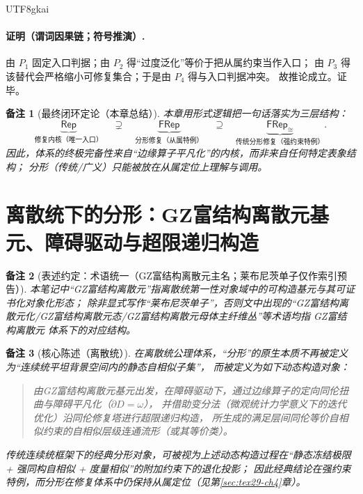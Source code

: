 \documentclass[12pt]{article}
\newtheorem{remark}{备注}[section]
\newcommand{\KouJing}{\texorpdfstring{表述约定}{表述约定}}
\newcommand{\GZMonFull}{\texorpdfstring{GZ富结构离散元}{GZ富结构离散元}}
\newcommand{\GZMon}{\texorpdfstring{GZ富结构离散元}{GZ富结构离散元}}
\newcommand{\GZMonization}{\texorpdfstring{GZ富结构离散元化}{GZ富结构离散元化}}
\newcommand{\GZMonState}{\texorpdfstring{GZ富结构离散元态}{GZ富结构离散元态}}
\newcommand{\GZMonMotherBundle}{\texorpdfstring{GZ富结构离散元母体主纤维丛}{GZ富结构离散元母体主纤维丛}}
\begin{document}
\begin{CJK*}{UTF8}{gkai}
\paragraph{证明（谓词因果链；符号推演）.}
由 $P_1$ 固定入口判据；由 $P_2$ 得“过度泛化”等价于把从属约束当作入口；
由 $P_3$ 得该替代会严格缩小可修复集合；于是由 $P_4$ 得与入口判据冲突。
故推论成立。证毕。

\begin{remark}[最终闭环定论（本章总结）]
本章用形式逻辑把一句话落实为三层结构：
\[
  \underbrace{\mathsf{Rep}}_{\text{修复内核（唯一入口）}}
  \quad\supsetneq\quad
  \underbrace{\mathsf{FRep}}_{\text{分形修复（从属特例）}}
  \quad\supseteq\quad
  \underbrace{\mathsf{FRep}_{\cong}}_{\text{传统分形修复（强约束特例）}}.
\]
因此，体系的终极完备性来自“边缘算子平凡化”的内核，而非来自任何特定表象结构；
分形（传统/广义）只能被放在\emph{从属定位}上理解与调用。
\end{remark}

\clearpage

\section{离散统下的分形：\GZMonFull{}基元、障碍驱动与超限递归构造}
\label{sec:tex29-ch5}

\begin{remark}[\KouJing：术语统一（\GZMonFull{}主名；莱布尼茨单子仅作索引预告）]
本笔记中“\GZMonFull{}”指离散统第一性对象域中的可构造基元与其可证书化对象化形态；
除非显式写作“莱布尼茨单子”，否则文中出现的“\GZMonization{}/\GZMonState{}/\GZMonMotherBundle{}”等术语均指 \GZMon{} 体系下的对应结构。
\end{remark}

\begin{remark}[核心陈述（离散统）]
在离散统公理体系，“分形”的原生本质不再被定义为“连续统平坦背景空间内的静态自相似子集”，
而被定义为如下动态构造对象：
\begin{quote}
由\GZMon{}基元出发，在障碍驱动下，通过边缘算子的定向同伦扭曲与障碍平凡化（$\partial D=\omega$），
并借助变分法（微观统计力学意义下的迭代优化）沿同伦修复塔进行超限递归构造，
所生成的满足层间同伦等价自相似约束的自相似层级连通流形（或其等价类）。
\end{quote}
传统连续统框架下的经典分形对象，可被视为上述动态构造过程在“静态冻结极限 + 强同构自相似 + 度量相似”的附加约束下的退化投影；
因此经典结论在强约束特例，而分形在修复体系中仍保持从属定位（见第\ref{sec:tex29-ch4}章）。
\end{remark}


\end{CJK*}
\end{document}
